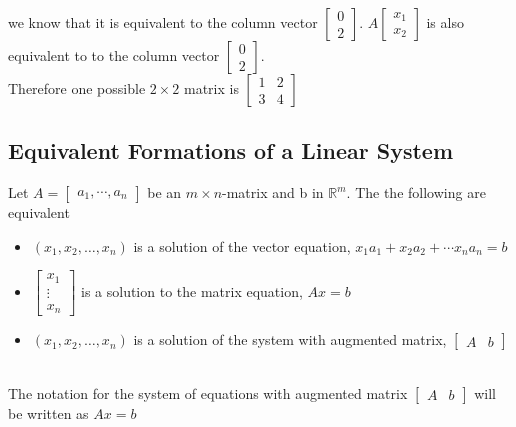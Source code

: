 we know that it is equivalent to the column vector $\begin{bmatrix}
  0 \\ 2
\end{bmatrix}$. $A \begin{bmatrix}
  x_1 \\ x_2
\end{bmatrix}$ is also equivalent to to the column vector $\begin{bmatrix}
  0 \\ 2
\end{bmatrix}$. 
\\[8pt]
Therefore one possible $2 \times 2$ matrix is $\begin{bmatrix}
  1 & 2 \\
  3 & 4
\end{bmatrix}$
\subsection{Equivalent Formations of a Linear System}
Let $A = \begin{bmatrix}
  a_1, \cdots, a_n
\end{bmatrix}$ be an $m \times n$-matrix and b in $\mathbb{R}^m$. The the following
are equivalent
\begin{itemize}
  \item $(x_1, x_2, \dots, x_n)$ is a solution of the vector equation, $x_1a_1 + x_2a_2 + \cdots x_na_n = b$
  \item $\begin{bmatrix}
    x_1 \\
    \vdots \\
    x_n
  \end{bmatrix}$ is a solution to the matrix equation, $Ax = b$
  \item $(x_1, x_2, \dots, x_n)$ is a solution of the system with augmented
    matrix, $\left[ \begin{array}{c|c}
      A & b
  \end{array} \right]$
\end{itemize}
\\[8pt]
The notation for the system of equations with augmented matrix $\begin{bmatrix}
  A & b
\end{bmatrix}$ will be written as $Ax = b$
